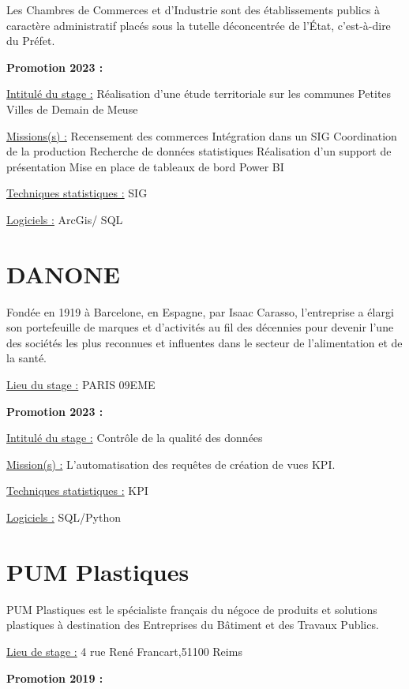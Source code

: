 \documentclass[
  letterpaper,
  DIV=11,
  numbers=noendperiod]{scrreprt}
\begin{document}
Les Chambres de Commerces et d'Industrie sont des établissements publics
à caractère administratif placés sous la tutelle déconcentrée de l'État,
c'est-à-dire du Préfet.

\textbf{Promotion 2023 :}

\uline{Intitulé du stage :} Réalisation d'une étude territoriale sur les
communes Petites Villes de Demain de Meuse

\uline{Missions(s) :} Recensement des commerces Intégration dans un SIG
Coordination de la production Recherche de données statistiques
Réalisation d'un support de présentation Mise en place de tableaux de
bord Power BI

\uline{Techniques statistiques :} SIG

\uline{Logiciels :} ArcGis/ SQL

\hypertarget{danone}{%
\section{\texorpdfstring{\textbf{DANONE}}{DANONE}}\label{danone}}

Fondée en 1919 à Barcelone, en Espagne, par Isaac Carasso, l'entreprise
a élargi son portefeuille de marques et d'activités au fil des décennies
pour devenir l'une des sociétés les plus reconnues et influentes dans le
secteur de l'alimentation et de la santé.

\uline{Lieu du stage :} PARIS 09EME

\textbf{Promotion 2023 :}

\uline{Intitulé du stage :} Contrôle de la qualité des données

\uline{Mission(s) :} L'automatisation des requêtes de création de vues
KPI.

\uline{Techniques statistiques :} KPI

\uline{Logiciels :} SQL/Python

\hypertarget{pum-plastiques}{%
\section{\texorpdfstring{\textbf{PUM
Plastiques}}{PUM Plastiques}}\label{pum-plastiques}}

PUM Plastiques est le spécialiste français du négoce de produits et
solutions plastiques à destination des Entreprises du Bâtiment et des
Travaux Publics.

\uline{Lieu de stage :} 4 rue René Francart,51100 Reims

\textbf{Promotion 2019 :}
\end{document}
